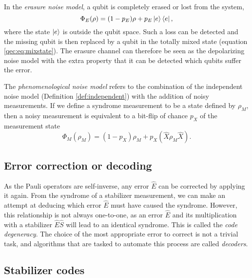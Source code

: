 \begin{definition}\label{def:erasure}
  In the \emph{erasure noise model}, a qubit is completely erased or lost from the system,
  \begin{equation}\label{qec:eq:erasure}
    \Phi_E(\rho) = (1-p_E)\rho + p_E\ket{e}\bra{e},
  \end{equation}
  where the state $\ket{e}$ is outside the qubit space. Such a loss can be detected and the missing qubit is then replaced by a qubit in the totally mixed state (equation \eqref{qec:eq:mixstate}). The erasure channel can therefore be seen as the depolarizing noise model with the extra property that it can be detected which qubits suffer the error.
\end{definition}

\begin{definition}\label{def:pheno}
  The \emph{phenomenological noise model} refers to the combination of the independent noise model (Definition \ref{def:independent}) with the addition of noisy measurements. If we define a syndrome measurement to be a state defined by $\rho_M$, then a noisy measurement is equivalent to a bit-flip of chance $p_X$ of the measurement state
  \begin{equation}\label{eq:pheno}
    \Phi_M(\rho_M)=  (1-p_X)\rho_M + p_X(\hat{X}\rho_M \hat{X}).
  \end{equation}
\end{definition}


\subsection{Error correction or decoding}

As the Pauli operators are self-inverse, any error $\hat{E}$ can be corrected by applying it again. From the syndrome of a stabilizer measurement, we can make an attempt at deducing which error $\hat{E}$ must have caused the syndrome. However, this relationship is not always one-to-one, as an error $\hat{E}$ and its multiplication with a stabilizer $\hat{E}\hat{S}$ will lead to an identical syndrome. This is called the \emph{code degeneracy}. The choice of the most appropriate error to correct is not a trivial task, and algorithms that are tasked to automate this process are called \emph{decoders}.

\subsection{Stabilizer codes}

